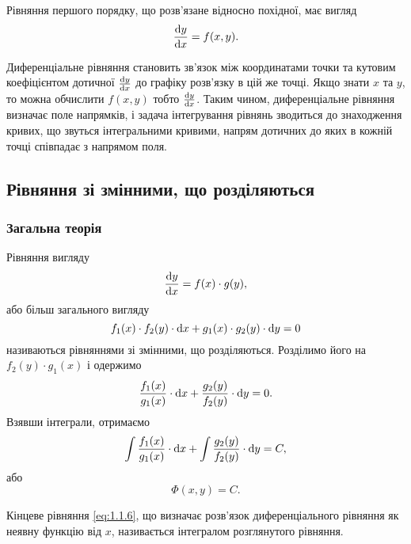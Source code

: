 Рівняння першого порядку, що розв’язане відносно похідної, має вигляд
\begin{equation}
	\label{eq:1.1.1}
	\frac{\mathop{}\!\mathrm{d} y}{\mathop{}\!\mathrm{d} x} = f(x, y).	
\end{equation}

Диференціальне рівняння становить зв’язок між координатами точки та кутовим коефіцієнтом дотичної $\frac{\mathop{}\!\mathrm{d} y}{\mathop{}\!\mathrm{d} x}$ до графіку розв’язку в цій же точці. Якщо знати $x$ та $y$, то можна обчислити $f(x, y)$ тобто $\frac{\mathop{}\!\mathrm{d} y}{\mathop{}\!\mathrm{d} x}$. Таким чином, диференціальне рівняння визначає поле напрямків, і задача інтегрування рівнянь зводиться до знаходження кривих, що звуться інтегральними кривими, напрям дотичних до яких в кожній точці співпадає з напрямом поля.

\subsection{Рівняння зі змінними, що розділяються}

\subsubsection{Загальна теорія}

Рівняння вигляду
\begin{equation}
	\label{eq:1.1.2}
	\frac{\mathop{}\!\mathrm{d} y}{\mathop{}\!\mathrm{d} x} = f(x) \cdot g(y),
\end{equation}
або більш загального вигляду
\begin{equation}
	\label{eq:1.1.3}
	f_1(x) \cdot f_2(y) \cdot \mathop{}\!\mathrm{d} x + g_1(x) \cdot g_2(y) \cdot \mathop{}\!\mathrm{d} y = 0
\end{equation}
називаються рівняннями зі змінними, що розділяються. Розділимо його на $f_2(y) \cdot g_1(x)$ і одержимо
\begin{equation}
	\label{eq:1.1.4}
	\frac{f_1(x)}{g_1(x)} \cdot \mathop{}\!\mathrm{d} x + \frac{g_2(y)}{f_2(y)} \cdot \mathop{}\!\mathrm{d} y = 0.
\end{equation}
Взявши інтеграли, отримаємо
\begin{equation}
	\label{eq:1.1.5}
	\int \frac{f_1(x)}{g_1(x)} \cdot \mathop{}\!\mathrm{d} x + \int \frac{g_2(y)}{f_2(y)} \cdot \mathop{}\!\mathrm{d} y = C,
\end{equation}
або 
\begin{equation}
	\label{eq:1.1.6}
	\Phi(x, y) = C.
\end{equation}

\begin{definition}
	Кінцеве рівняння \eqref{eq:1.1.6}, що визначає розв’язок диференціального рівняння як неявну функцію від $x$, називається інтегралом розглянутого рівняння.
\end{definition}

